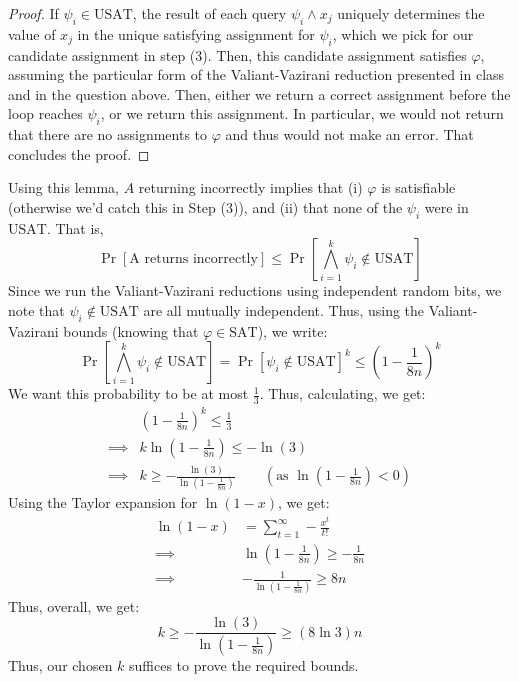 \documentclass[12pt]{article}
\begin{document}
\begin{solution}
\begin{proof}
        If $\psi_i \in \text{USAT}$, the result of each query $\psi_i \land x_j$ uniquely determines the value of $x_j$ in the unique satisfying assignment for $\psi_i$, which we pick for our candidate assignment in step (3). Then, this candidate assignment satisfies $\varphi$, assuming the particular form of the Valiant-Vazirani reduction presented in class and in the question above. Then, either we return a correct assignment before the loop reaches $\psi_i$, or we return this assignment. In particular, we would not return that there are no assignments to $\varphi$ and thus would not make an error. That concludes the proof.
    \end{proof}
    Using this lemma, $A$ returning incorrectly implies that (i) $\varphi$ is satisfiable (otherwise we'd catch this in Step (3)), and (ii) that none of the $\psi_i$ were in $\text{USAT}$. That is, 
    \[ \Pr[\text{A returns incorrectly}] \leq \Pr\left[\bigwedge_{i=1}^k \psi_i \not \in \text{USAT}\right] \]
    Since we run the Valiant-Vazirani reductions using independent random bits, we note that $\psi_i \not \in \text{USAT}$ are all mutually independent. Thus, using the Valiant-Vazirani bounds (knowing that $\varphi \in \text{SAT}$), we write: 
    \[ \Pr\left[\bigwedge_{i=1}^k \psi_i \not \in \text{USAT}\right] = \Pr\left[\psi_i \not \in \text{USAT}\right]^k  \leq \left(1-\frac{1}{8n}\right)^k\] 
    We want this probability to be at most $\frac{1}{3}$. Thus, calculating, we get: 
    \begin{align*}
        &\left(1-\frac{1}{8n}\right)^k \leq \frac{1}{3} \\
        \implies&k \ln\left(1-\frac{1}{8n}\right) \leq -\ln(3) \\
        \implies& k \geq -\frac{\ln(3)}{\ln\left(1-\frac{1}{8n}\right)} \qquad \left( \text{as }\ln\left(1-\frac{1}{8n}\right) < 0\right)
    \end{align*}
    Using the Taylor expansion for $\ln(1-x)$, we get: 
    \begin{align*}
        \ln(1-x) &= \sum_{t=1}^\infty -\frac{x^t}{t!} \\
        \implies &\ln\left(1-\frac{1}{8n}\right) \geq -\frac{1}{8n} \\
        \implies &-\frac{1}{\ln\left(1-\frac{1}{8n}\right)} \geq 8n
    \end{align*}
    \[ \]
    Thus, overall, we get: 
    \[ k \geq -\frac{\ln(3)}{\ln\left(1-\frac{1}{8n}\right)} \geq (8\ln 3)n\]
    Thus, our chosen $k$ suffices to prove the required bounds.
\end{solution}
\end{document}
